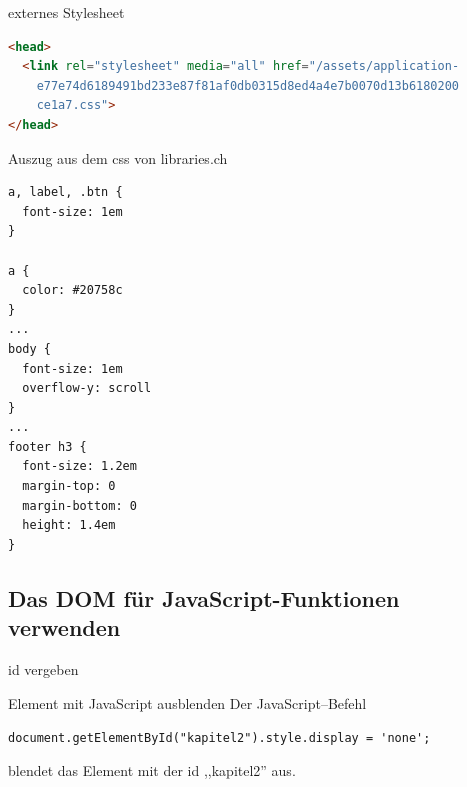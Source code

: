 \begin{frame}[fragile]{externes Stylesheet}
  \selectfont
  \begin{lstlisting}[language=html]
<head>
  <link rel="stylesheet" media="all" href="/assets/application-
    e77e74d6189491bd233e87f81af0db0315d8ed4a4e7b0070d13b6180200
    ce1a7.css">
</head>
  \end{lstlisting}
\end{frame}


\begin{frame}[fragile]{Auszug aus dem css von libraries.ch}
  \selectfont
  \begin{lstlisting}[language=html]
a, label, .btn {
  font-size: 1em
}

a {
  color: #20758c
}
...
body {
  font-size: 1em
  overflow-y: scroll
}
...
footer h3 {
  font-size: 1.2em
  margin-top: 0
  margin-bottom: 0
  height: 1.4em
}
  \end{lstlisting}
\end{frame}


\subsection{Das DOM für JavaScript-Funktionen verwenden}
\label{sub:das_dom_für_javascript_funktionen}


\begin{frame}[fragile]{id vergeben}
  \selectfont
  
\end{frame}

\begin{frame}[fragile]{Element mit JavaScript ausblenden}
  \selectfont
  Der JavaScript--Befehl 

  \lstinline{document.getElementById("kapitel2").style.display = 'none';}

  blendet das Element mit der id ,,kapitel2'' aus.
\end{frame}

